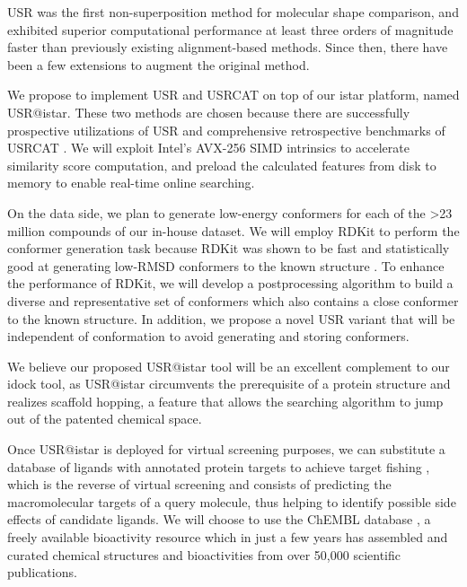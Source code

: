\documentclass[a4paper,12pt]{article}
\begin{document}
USR \citep{1379} was the first non-superposition method for molecular shape comparison, and exhibited superior computational performance at least three orders of magnitude faster than previously existing alignment-based methods. Since then, there have been a few extensions \citep{1333,1436,1437,1334,1335,1337,1338,1331,1407,1408} to augment the original method.

We propose to implement USR \citep{1379} and USRCAT \citep{1331} on top of our istar platform, named USR@istar. These two methods are chosen because there are successfully prospective utilizations of USR \citep{1380,1281,1504,1502,1615} and comprehensive retrospective benchmarks of USRCAT \citep{1331}. We will exploit Intel's AVX-256 SIMD intrinsics to accelerate similarity score computation, and preload the calculated features from disk to memory to enable real-time online searching.

On the data side, we plan to generate low-energy conformers for each of the \textgreater23 million compounds of our in-house dataset. We will employ RDKit to perform the conformer generation task because RDKit was shown to be fast and statistically good at generating low-RMSD conformers to the known structure \cite{1127}. To enhance the performance of RDKit, we will develop a postprocessing algorithm to build a diverse and representative set of conformers which also contains a close conformer to the known structure. In addition, we propose a novel USR variant that will be independent of conformation to avoid generating and storing conformers.

We believe our proposed USR@istar tool will be an excellent complement to our idock tool, as USR@istar circumvents the prerequisite of a protein structure and realizes scaffold hopping, a feature that allows the searching algorithm to jump out of the patented chemical space.

Once USR@istar is deployed for virtual screening purposes, we can substitute a database of ligands with annotated protein targets to achieve target fishing \cite{1408}, which is the reverse of virtual screening and consists of predicting the macromolecular targets of a query molecule, thus helping to identify possible side effects of candidate ligands. We will choose to use the ChEMBL database \cite{1424,1441}, a freely available bioactivity resource which in just a few years has assembled and curated chemical structures and bioactivities from over 50,000 scientific publications.

\end{document}
